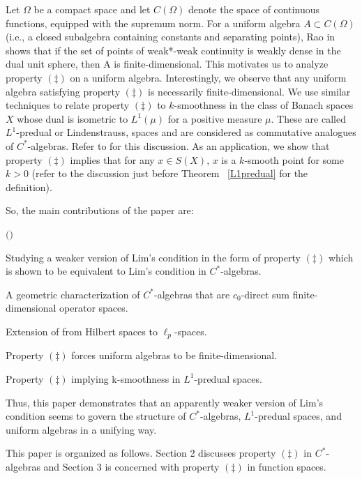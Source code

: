 \documentclass[11pt]{amsart}
\newcounter{cnt1}
\newcounter{cnt2}
\newcommand{\bla}{\begin{list}{$($\alph{cnt2}$)$}
 {\usecounter{cnt2} \setlength{\topsep}{0pt}
 \setlength{\itemsep}{0pt}}}
\newcommand{\el}{\end{list}}
\begin{document}
Let $\Omega$ be a compact space and let $C(\Omega)$ denote the space of continuous functions, equipped with the supremum norm. For a uniform algebra $A \subset C(\Omega)$ (i.e., a closed subalgebra containing constants and separating points), Rao in \cite[Theorem 11]{Rao} shows that if the set of points of weak*-weak continuity is weakly dense in the dual unit sphere, then A is finite-dimensional. This motivates us to analyze property $(\ddag)$ on a uniform algebra. Interestingly, we observe that any uniform algebra satisfying property $(\ddag)$ is necessarily finite-dimensional. We use similar techniques to relate property $(\ddag)$ to $k$-smoothness in the class of Banach spaces $X$ whose dual is isometric to $L^1(\mu)$ for a positive measure $\mu$. These are called $L^1$-predual or Lindenstrauss, spaces and are considered as commutative analogues of $C^\ast$-algebras. Refer to \cite[Chapter 7]{L} for this discussion. As an application, we show that property $(\ddagger)$ implies that for any  $x \in S(X)$, $x$ is a $k$-smooth point for some $k>0$ (refer to the discussion just before Theorem ~\ref{L1predual} for the definition). 

So, the main contributions of the paper are:
\bla
\item Studying a weaker version of Lim's condition in the form of property $(\ddag)$ which is shown to be equivalent to Lim's condition in $C^*$-algebras.

\item A geometric characterization of $C^*$-algebras that are $c_0$-direct sum finite-dimensional operator spaces.

\item Extension of \cite[Theorem 5]{LM} from Hilbert spaces to $\ell_p$-spaces.

\item Property $(\ddag)$ forces uniform algebras to be finite-dimensional.

\item Property $(\ddag)$ implying k-smoothness in $L^1$-predual spaces.

\el

Thus, this paper demonstrates that an apparently weaker version of Lim's condition seems to govern the structure of $C^*$-algebras, $L^1$-predual spaces, and uniform algebras in a unifying way.

This paper is organized as follows. Section 2 discusses property $(\ddag)$ in $C^*$-algebras and Section 3 is concerned with property $(\ddag)$ in function spaces.
\end{document}
